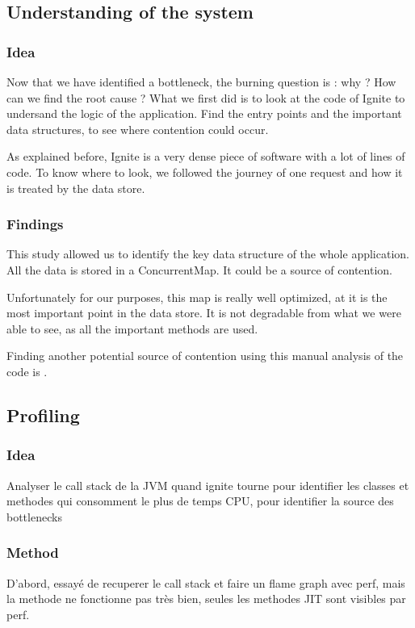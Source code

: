 \documentclass[conference]{IEEEtran}
\begin{document}
\subsection{Understanding of the system}
\subsubsection{Idea}
Now that we have identified a bottleneck, the burning question is : why ? How can we find the root cause ?
What we first did is to look at the code of Ignite to undersand the logic of the application. Find the entry points and the important data structures, to see where contention could occur.

As explained before, Ignite is a very dense piece of software with a lot of lines of code. To know where to look, we followed the journey of one request and how it is treated by the data store.

\subsubsection{Findings}
This study allowed us to identify the key data structure of the whole application. All the data is stored in a ConcurrentMap. It could be a source of contention.

Unfortunately for our purposes, this map is really well optimized, at it is the most important point in the data store. It is not degradable from what we were able to see, as all the important methods are used. 

Finding another potential source of contention using this manual analysis of the code is .

\subsection{Profiling}
\subsubsection{Idea}
Analyser le call stack de la JVM quand ignite tourne pour identifier les classes et methodes qui consomment le plus de temps CPU, pour identifier la source des bottlenecks
\subsubsection{Method}
D'abord, essayé de recuperer le call stack et faire un flame graph avec perf, mais la methode ne fonctionne pas très bien, seules les methodes JIT sont visibles par perf.
\end{document}
